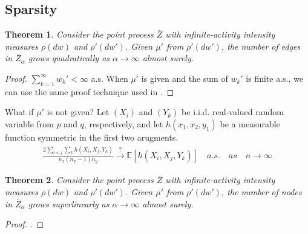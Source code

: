 \documentclass{article}
\newtheorem{theorem}{Theorem}[section]
\begin{document}
\subsection{Sparsity}

\begin{theorem} Consider the point process $\bar{Z}$ with infinite-activity intensity measures $\rho(dw)$ and $\rho'(dw')$. Given $\mu'$ from $\rho'(dw')$, the number of edges in $\bar{Z}_{\alpha}$ grows quadratically as $\alpha \rightarrow \infty$ almost surely.
\end{theorem}
\begin{proof}
$\sum_{k=1}^{\infty} w_k' < \infty$ a.s. When $\mu'$ is given and the sum of $w_k'$ is finite a.s., we can use the same proof technique used in \cite{Caron2015}.
\end{proof}
What if $\mu'$ is not given? Let $(X_i)$ and $(Y_k)$ be i.i.d. real-valued random variable from $p$ and $q$, respectively, and let $h(x_1, x_2, y_1)$ be a measurable function symmetric in the first two arugments. 
\begin{align}
\frac{2 \sum_{i<j}\sum_{k} h(X_i, X_j, Y_k)}{n_x(n_x -1) n_y} \xrightarrow[]{?} \mathbb{E}[h(X_i, X_j, Y_k)]\quad a.s.\quad as \quad n\rightarrow \infty
\end{align}

\begin{theorem} Consider the point process $\bar{Z}$ with infinite-activity intensity measures $\rho(dw)$ and $\rho'(dw')$. Given $\mu'$ from $\rho'(dw')$, the number of nodes in $\bar{Z}_{\alpha}$ grows superlinearly as $\alpha \rightarrow \infty$ almost surely.
\end{theorem}
\begin{proof}
.
\end{proof}



\end{document}
